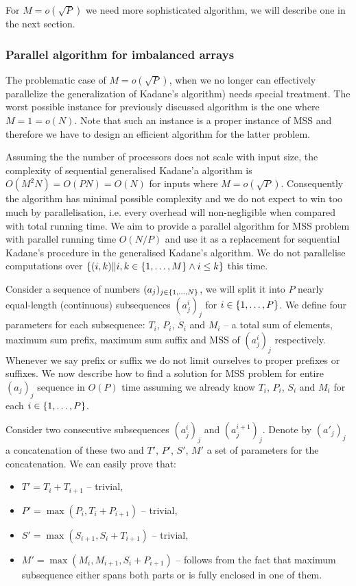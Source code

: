 For $M = o(\sqrt{P})$ we need more sophisticated algorithm, we will describe one in the next section.

\subsubsection*{Parallel algorithm for imbalanced arrays}

The problematic case of $M = o(\sqrt{P})$, when we no longer can effectively parallelize the generalization of Kadane's algorithm) needs special treatment.
The worst possible instance for previously discussed algorithm is the one where $M = 1 = o(N)$.
Note that such an instance is a proper instance of MSS and therefore we have to design an efficient algorithm for the latter problem.

Assuming the the number of processors does not scale with input size, the complexity of sequential generalised Kadane'a algorithm is $O(M^2 N) = O(P N) = O(N)$ for inputs where $M = o(\sqrt{P})$.
Consequently the algorithm has minimal possible complexity and we do not expect to win too much by parallelisation, i.e. every overhead will non-negligible when compared with total running time. We aim to provide a parallel algorithm for MSS problem with parallel running time $O(N / P)$ and use it as a replacement for sequential Kadane's procedure in the generalised Kadane's algorithm.
We do not parallelise computations over $\{ (i, k) \| i, k \in \{ 1, \dots, M \} \land i \leq k \}$ this time.

Consider a sequence of numbers $(a_j)_{j \in \{ 1, \dots, N \}}$, we will split it into $P$ nearly equal-length (continuous) subsequences $(a^i_j)_j$ for $i \in \{ 1, \dots, P \}$.
We define four parameters for each subsequence: $T_i$, $P_i$, $S_i$ and $M_i$ -- a total sum of elements, maximum sum prefix, maximum sum suffix and MSS of $(a^i_j)_j$ respectively.
Whenever we say prefix or suffix we do not limit ourselves to proper prefixes or suffixes.
We now describe how to find a solution for MSS problem for entire $(a_j)_j$ sequence in $O(P)$ time assuming we already know $T_i$, $P_i$, $S_i$ and $M_i$ for each $i \in \{ 1, \dots, P \}$.

Consider two consecutive subsequences $(a^i_j)_j$ and $(a^{i+1}_j)_j$.
Denote by $(a'_j)_j$ a concatenation of these two and $T'$, $P'$, $S'$, $M'$ a set of parameters for the concatenation.
We can easily prove that:
\begin{itemize}
    \item $T' = T_i + T_{i+1}$ -- trivial,
    \item $P' = \max(P_i, T_i + P_{i+1})$ -- trivial,
    \item $S' = \max(S_{i+1}, S_i + T_{i+1})$ -- trivial,
    \item $M' = \max(M_i, M_{i+1}, S_i + P_{i+1})$ -- follows from the fact that maximum subsequence either spans both parts or is fully enclosed in one of them.
\end{itemize}


